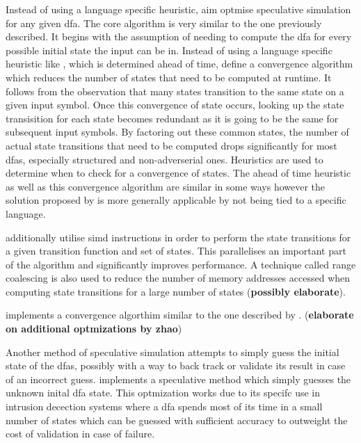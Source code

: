 Instead of using a language specific heuristic,
\cite{mytkowicz_data-parallel_2014} aim optmise speculative simulation for
any given \gls{dfa}. The core algorithm is very similar to the one previously
described. It begins with the assumption of needing to compute the \gls{dfa} for
every possible initial state the input can be in. Instead of using a language
specific heuristic like \cite{barenghi_parallel_2015}, which is determined ahead
of time, \cite{mytkowicz_data-parallel_2014} define a convergence algorithm
which reduces the number of states that need to be computed at runtime. It
follows from the observation that many states transition to the same state on a
given input symbol. Once this convergence of state occurs, looking up the state
transisition for each state becomes redundant as it is going to be the same
for subsequent input symbols. By factoring out these common states, the number
of actual state transitions that need to be computed drops significantly for
most \gls{dfa}s, especially structured and non-adverserial ones. Heuristics are
used to determine when to check for a  convergence of states. The ahead of time
heuristic as well as this convergence algorithm are similar in some ways however
the solution proposed by \cite{mytkowicz_data-parallel_2014} is more generally
applicable by not being tied to a specific language.

\cite{mytkowicz_data-parallel_2014} additionally utilise \gls{simd} instructions
in order to perform the state transitions for a given transition function
and set of states. This parallelises an important part of the algorithm and
significantly improves performance. A technique called range coalescing is also
used to reduce the number of memory addresses accessed when computing state
transitions for a large number of states (\textbf{possibly elaborate}).

\cite{zhao_--fly_2015} implements a convergence algorthim similar to the
one described by  \cite{mytkowicz_data-parallel_2014}. (\textbf{elaborate on
additional optmizations by zhao})

Another method of speculative simulation attempts to simply guess the initial
state of the \gls{dfa}s, possibly with a way to back track or validate
its result in case of an incorrect guess. \cite{luchaup_multi-byte_2009,
luchaup_speculative_2011} implements a speculative method which simply guesses
the unknown inital \gls{dfa} state. This optmization works due to its specifc
use in intrusion decection systems where a \gls{dfa} spends most of its time
in a small number of states which can be guessed with sufficient accuracy to
outweight the cost of validation in case of failure.

